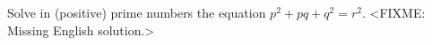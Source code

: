 \problem
Solve in (positive) prime numbers the equation $p^2 + p q + q^2 = r^2$.
\solution
<FIXME: Missing English solution.>
\endproblem
